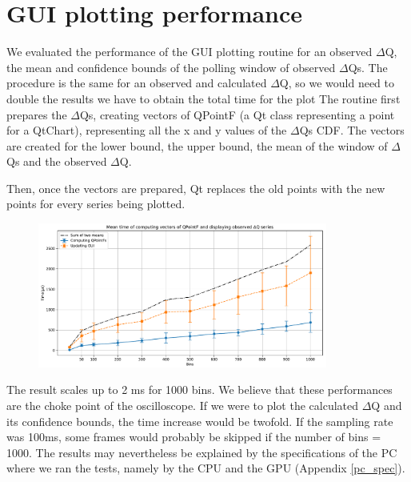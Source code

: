 \section{GUI plotting performance}
    We evaluated the performance of the GUI plotting routine for an observed $\Delta$Q, the mean and confidence bounds of the polling window of observed $\Delta$Qs. The procedure is the same for an observed and calculated $\Delta$Q, so we would need to double the results we have to obtain the total time for the plot
    The routine first prepares the $\Delta$Qs, creating vectors of QPointF (a Qt class representing a point for a QtChart), representing all the x and y values of the $\Delta$Qs CDF. The vectors are created for the lower bound, the upper bound, the mean of the window of $\Delta$Qs and the observed $\Delta$Q.

    Then, once the vectors are prepared, Qt replaces the old points with the new points for every series being plotted.

    \begin{figure}[H]
        \begin{center}
            \includegraphics[width = 0.85\textwidth]{img/plots.pdf}
        \end{center}
    \end{figure}
    
    The result scales up to 2 ms for 1000 bins. We believe that these performances are the choke point of the oscilloscope. If we were to plot the calculated $\Delta$Q and its confidence bounds, the time increase would be twofold. If the sampling rate was 100ms, some frames would probably be skipped if the number of bins = 1000. The results may nevertheless be explained by the specifications of the PC where we ran the tests, namely by the CPU and the GPU (Appendix \ref{pc_spec}).
